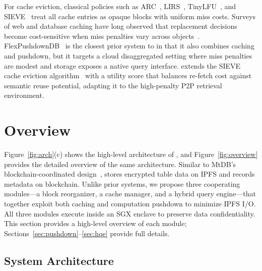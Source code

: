  
For cache eviction, classical policies such as ARC~\cite{megiddo2003arc}, LIRS~\cite{jiang2002lirs}, TinyLFU~\cite{einziger2017tinylfu}, and SIEVE~\cite{zhang2024sieve} treat all cache entries as opaque blocks with uniform miss costs. Surveys of web and database caching have long observed that replacement decisions become cost-sensitive when miss penalties vary across objects~\cite{podlipnig2003survey}. FlexPushdownDB~\cite{yang2021flexpushdowndb} is the closest prior system to \ours{} in that it also combines caching and pushdown, but it targets a cloud disaggregated setting where miss penalties are modest and storage exposes a native query interface. \ours{} extends the SIEVE cache eviction algorithm~\cite{zhang2024sieve} with a utility score that balances re-fetch cost against semantic reuse potential, adapting it to the high-penalty P2P retrieval environment.


\section{\ours{} Overview}
\label{sec:overview}
 
Figure~\ref{fig:arch}(c) shows the high-level architecture of \ours{}, and Figure~\ref{fig:overview} provides the detailed overview of the same architecture. Similar to MtDB's blockchain-coordinated design~\cite{hossain2025mtdb}, \ours{} stores encrypted table data on IPFS and records metadata on blockchain. Unlike prior systems, we propose three cooperating modules---a block reorganizer, a cache manager, and a hybrid query engine---that together exploit both caching and computation pushdown to minimize IPFS I/O. All three modules execute inside an SGX enclave to preserve data confidentiality. This section provides a high-level overview of each module; Sections~\ref{sec:pushdown}--\ref{sec:hqe} provide full details.
 
\subsection{System Architecture}
\label{sec:sys_arch}
 

